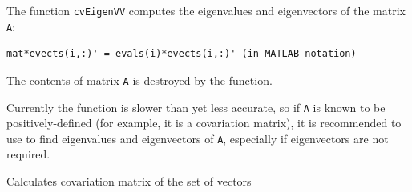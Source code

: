 \begin{description}
\end{description}


The function \texttt{cvEigenVV} computes the eigenvalues and eigenvectors of the matrix \texttt{A}:

\begin{lstlisting}
mat*evects(i,:)' = evals(i)*evects(i,:)' (in MATLAB notation)
\end{lstlisting}

The contents of matrix \texttt{A} is destroyed by the function.

Currently the function is slower than  yet less accurate,
so if \texttt{A} is known to be positively-defined (for example, it
is a covariation matrix), it is recommended to use  to find
eigenvalues and eigenvectors of \texttt{A}, especially if eigenvectors
are not required.

\label{CalcCovarMatrix}

Calculates covariation matrix of the set of vectors


